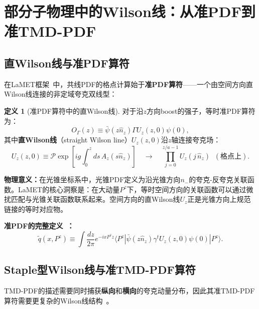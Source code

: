 \documentclass[12pt,a4paper]{ctexart}
\theoremstyle{definition}
\newtheorem{definition}{定义}[section]
\begin{document}
\section{部分子物理中的Wilson线：从准PDF到准TMD-PDF}

\subsection{直Wilson线与准PDF算符}

在LaMET框架~\cite{Ji2013Euclidean,Ji2014LaMET}中，共线PDF的格点计算始于\textbf{准PDF算符}——一个由空间方向直Wilson线连接的非定域夸克双线型：

\begin{definition}[准PDF算符中的直Wilson线]
对于沿$z$方向boost的强子，等时准PDF算符为：
\begin{equation}
O_\Gamma(z) \equiv \bar\psi(z\hat n_z) \Gamma U_z(z,0) \psi(0),
\label{eq:quasi_PDF_operator}
\end{equation}
其中\textbf{直Wilson线}（straight Wilson line）$U_z(z,0)$沿$z$轴连接夸克场：
\begin{equation}
U_z(z,0) \equiv \mathcal{P}\exp\!\left[ig\int_0^z ds\, A_z(s\hat n_z)\right] \quad\longrightarrow\quad \prod_{j=0}^{z/a-1} U_z(j\,\hat n_z) \;\;(\text{格点上}).
\label{eq:straight_WL}
\end{equation}
\end{definition}

\textbf{物理意义：}在光锥坐标系中，光锥PDF定义为沿光锥方向$n_-$的夸克-反夸克关联函数。LaMET的核心洞察是：在大动量$P^z$下，等时空间方向的关联函数可以通过微扰匹配与光锥关联函数联系起来。空间方向的直Wilson线$U_z$正是光锥方向上规范链接的等时对应物。

\textbf{准PDF的完整定义~\cite{Ji2013Euclidean}：}
\begin{equation}
\tilde q(x, P^z) \equiv \int \frac{dz}{2\pi} e^{-i x P^z z} \langle P^z | \bar\psi(z\hat n_z) \gamma^t U_z(z,0) \psi(0) | P^z \rangle.
\label{eq:quasi_PDF_full}
\end{equation}

\subsection{Staple型Wilson线与准TMD-PDF算符}

TMD-PDF的描述需要同时捕获\textbf{纵向}和\textbf{横向}的夸克动量分布，因此其准TMD-PDF算符需要更复杂的Wilson线结构~\cite{Zhang2022renormTMD,He2024unpolTMD,Ma2025BoerMulders}。
\end{document}
